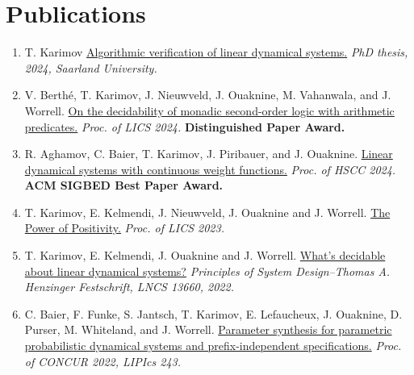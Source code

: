 \documentclass{article}
\begin{document}
	\section*{Publications}
	\begin{enumerate}
		\item T. Karimov
		\newline \href{https://publikationen.sulb.uni-saarland.de/handle/20.500.11880/37285}{Algorithmic verification of linear dynamical systems.}
		\newline\emph{PhD thesis, 2024, Saarland University.}
		
		\item V. Berth\'e, T. Karimov, J. Nieuwveld, J. Ouaknine, M. Vahanwala, and J. Worrell.
		\newline\href{https://doi.org/10.1145/3661814.3662119}{On the decidability of monadic second-order logic with arithmetic predicates.}
		\newline\emph{Proc. of LICS 2024.} \textbf{Distinguished Paper Award.} 
		
		\item R. Aghamov, C. Baier, T. Karimov, J. Piribauer, and J. Ouaknine.
		\newline\href{https://doi.org/10.1145/3641513.36501}{Linear dynamical systems with continuous weight functions.}
		\newline\emph{Proc. of HSCC 2024.} \textbf{ACM SIGBED Best Paper Award.}
		
		\item T. Karimov, E. Kelmendi, J. Nieuwveld, J. Ouaknine and J. Worrell.
		\newline \href{https://ieeexplore.ieee.org/document/10175758}{The Power of Positivity.}
		\newline\emph{Proc. of LICS 2023.} 
		
		\item T. Karimov, E. Kelmendi, J. Ouaknine and J. Worrell.
		\newline \href{https://doi.org/10.1007/978-3-031-22337-2_2}{What's decidable about linear dynamical systems?}
		\newline\emph{Principles of System Design--Thomas A. Henzinger Festschrift, LNCS 13660, 2022.}
		
		\item C. Baier, F. Funke, S. Jantsch, T. Karimov, E. Lefaucheux, J. Ouaknine, D. Purser, M. Whiteland, and J. Worrell. 
		\newline \href{https://drops.dagstuhl.de/opus/volltexte/2022/17073/}{Parameter synthesis for parametric probabilistic dynamical systems and prefix-independent specifications.}
		\newline\emph{Proc. of CONCUR 2022, LIPIcs 243.}
		

\end{enumerate}
\end{document}
